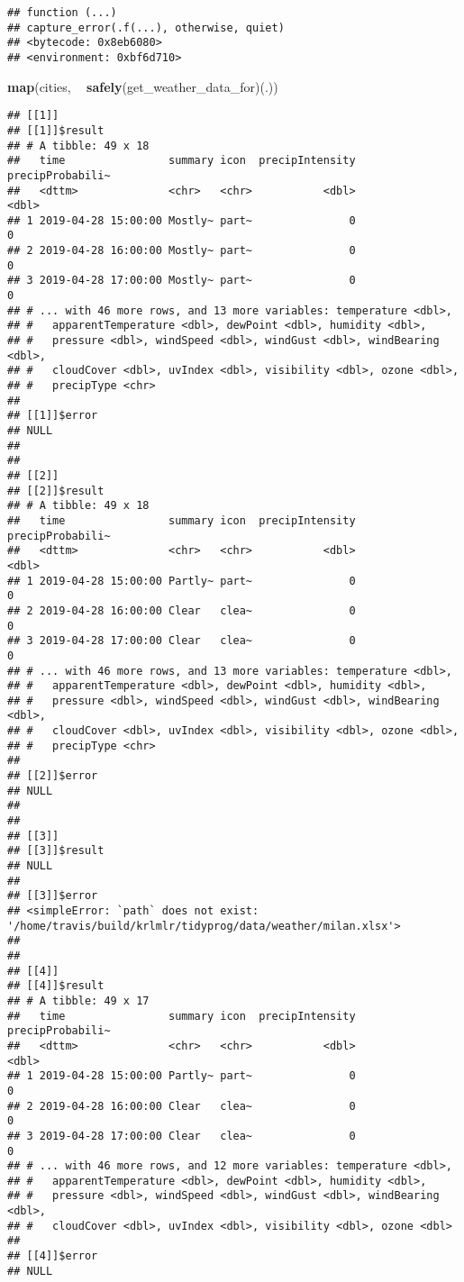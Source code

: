 \documentclass[]{book}
\newenvironment{Shaded}{\begin{snugshade}}{\end{snugshade}}
\newcommand{\KeywordTok}[1]{\textcolor[rgb]{0.13,0.29,0.53}{\textbf{#1}}}
\newcommand{\NormalTok}[1]{#1}
\newcommand{\OperatorTok}[1]{\textcolor[rgb]{0.81,0.36,0.00}{\textbf{#1}}}
\newcommand{\StringTok}[1]{\textcolor[rgb]{0.31,0.60,0.02}{#1}}
\begin{document}
\begin{verbatim}
## function (...) 
## capture_error(.f(...), otherwise, quiet)
## <bytecode: 0x8eb6080>
## <environment: 0xbf6d710>
\end{verbatim}

\begin{Shaded}
\begin{Highlighting}[]
\KeywordTok{map}\NormalTok{(cities, }\OperatorTok{~}\StringTok{ }\KeywordTok{safely}\NormalTok{(get_weather_data_for)(.))}
\end{Highlighting}
\end{Shaded}

\begin{verbatim}
## [[1]]
## [[1]]$result
## # A tibble: 49 x 18
##   time                summary icon  precipIntensity precipProbabili~
##   <dttm>              <chr>   <chr>           <dbl>            <dbl>
## 1 2019-04-28 15:00:00 Mostly~ part~               0                0
## 2 2019-04-28 16:00:00 Mostly~ part~               0                0
## 3 2019-04-28 17:00:00 Mostly~ part~               0                0
## # ... with 46 more rows, and 13 more variables: temperature <dbl>,
## #   apparentTemperature <dbl>, dewPoint <dbl>, humidity <dbl>,
## #   pressure <dbl>, windSpeed <dbl>, windGust <dbl>, windBearing <dbl>,
## #   cloudCover <dbl>, uvIndex <dbl>, visibility <dbl>, ozone <dbl>,
## #   precipType <chr>
## 
## [[1]]$error
## NULL
## 
## 
## [[2]]
## [[2]]$result
## # A tibble: 49 x 18
##   time                summary icon  precipIntensity precipProbabili~
##   <dttm>              <chr>   <chr>           <dbl>            <dbl>
## 1 2019-04-28 15:00:00 Partly~ part~               0                0
## 2 2019-04-28 16:00:00 Clear   clea~               0                0
## 3 2019-04-28 17:00:00 Clear   clea~               0                0
## # ... with 46 more rows, and 13 more variables: temperature <dbl>,
## #   apparentTemperature <dbl>, dewPoint <dbl>, humidity <dbl>,
## #   pressure <dbl>, windSpeed <dbl>, windGust <dbl>, windBearing <dbl>,
## #   cloudCover <dbl>, uvIndex <dbl>, visibility <dbl>, ozone <dbl>,
## #   precipType <chr>
## 
## [[2]]$error
## NULL
## 
## 
## [[3]]
## [[3]]$result
## NULL
## 
## [[3]]$error
## <simpleError: `path` does not exist: '/home/travis/build/krlmlr/tidyprog/data/weather/milan.xlsx'>
## 
## 
## [[4]]
## [[4]]$result
## # A tibble: 49 x 17
##   time                summary icon  precipIntensity precipProbabili~
##   <dttm>              <chr>   <chr>           <dbl>            <dbl>
## 1 2019-04-28 15:00:00 Partly~ part~               0                0
## 2 2019-04-28 16:00:00 Clear   clea~               0                0
## 3 2019-04-28 17:00:00 Clear   clea~               0                0
## # ... with 46 more rows, and 12 more variables: temperature <dbl>,
## #   apparentTemperature <dbl>, dewPoint <dbl>, humidity <dbl>,
## #   pressure <dbl>, windSpeed <dbl>, windGust <dbl>, windBearing <dbl>,
## #   cloudCover <dbl>, uvIndex <dbl>, visibility <dbl>, ozone <dbl>
## 
## [[4]]$error
## NULL
\end{verbatim}
\end{document}
